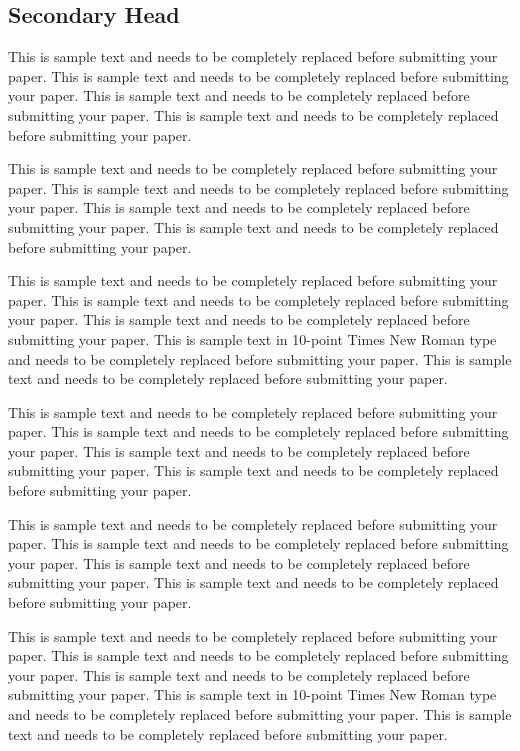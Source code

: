 \documentclass{asaproc}
\begin{document}
\subsection{Secondary Head}

This is sample text and needs to be completely replaced before submitting your paper. This is sample text and needs to be completely replaced before submitting your paper. This is sample text and needs to be completely replaced before submitting your paper. This is sample text and needs to be completely replaced before submitting your paper.

This is sample text and needs to be completely replaced before submitting your paper. This is sample text and needs to be completely replaced before submitting your paper.  This is sample text and needs to be completely replaced before submitting your paper. This is sample text and needs to be completely replaced before submitting your paper.

This is sample text and needs to be completely replaced before submitting your paper. This is sample text and needs to be completely replaced before submitting your paper. This is sample text and needs to be completely replaced before submitting your paper. This is sample text in 10-point Times New Roman type and needs to be completely replaced before submitting your paper. This is sample text and needs to be completely replaced before submitting your paper.

This is sample text and needs to be completely replaced before submitting your paper. This is sample text and needs to be completely replaced before submitting your paper. This is sample text and needs to be completely replaced before submitting your paper. This is sample text and needs to be completely replaced before submitting your paper.

This is sample text and needs to be completely replaced before submitting your paper. This is sample text and needs to be completely replaced before submitting your paper.  This is sample text and needs to be completely replaced before submitting your paper. This is sample text and needs to be completely replaced before submitting your paper.

This is sample text and needs to be completely replaced before submitting your paper. This is sample text and needs to be completely replaced before submitting your paper. This is sample text and needs to be completely replaced before submitting your paper. This is sample text in 10-point Times New Roman type and needs to be completely replaced before submitting your paper. This is sample text and needs to be completely replaced before submitting your paper.
\end{document}
